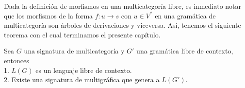 \documentclass[../main.tex]{subfiles}
\begin{document}
Dada la definición de morfismos en una multicategoría libre, es inmediato notar que los morfismos de la forma $f:u \to s$ con $u \in V^*$ en una gramática de multicategoría son árboles de derivaciones y viceversa. Así, tenemos el siguiente teorema con el cual terminamos el presente capítulo.  
\begin{thm}
	Sea $G$ una signatura de multicategoría y $G'$ una gramática libre de contexto, entonces\\
	1. $L(G)$ es un lenguaje libre de contexto.\\
	2. Existe una signatura de multigráfica que genera a $L(G')$. 
\end{thm}
\end{document}

